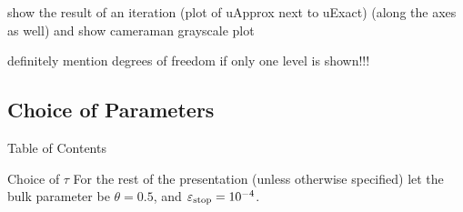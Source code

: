 \begin{frame}
  show the result of an iteration (plot of uApprox next to uExact) 
  (along the axes as well)
  and show cameraman grayscale plot

  definitely mention degrees of freedom if only one level is shown!!!
\end{frame}

\subsection{Choice of Parameters}
\begin{frame}[noframenumbering]{Table of Contents}
\end{frame}

\begin{frame}{Choice of $\tau$}
  For the rest of the presentation (unless otherwise specified) let the bulk
  parameter be $\theta = 0.5$, and $\varepsilon_\textup{stop}= 10^{-4}$.
\end{frame}
